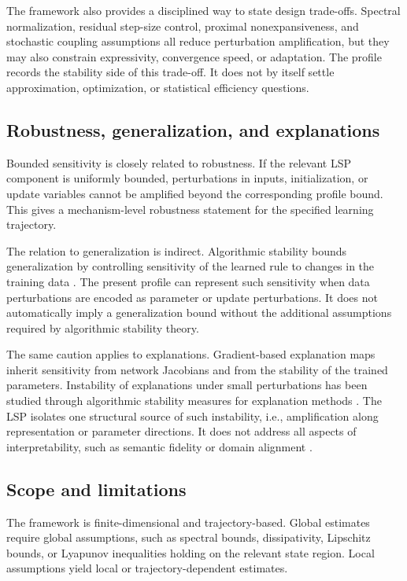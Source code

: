 \documentclass{article}
\numberwithin{equation}{section}
\begin{document}
The framework also provides a disciplined way to state design trade-offs. Spectral normalization, residual step-size control, proximal nonexpansiveness, and stochastic coupling assumptions all reduce perturbation amplification, but they may also constrain expressivity, convergence speed, or adaptation. The profile records the stability side of this trade-off. It does not by itself settle approximation, optimization, or statistical efficiency questions.

\subsection{Robustness, generalization, and explanations}
\label{subsec:robustness-generalization-explanations}

Bounded sensitivity is closely related to robustness. If the relevant LSP component is uniformly bounded, perturbations in inputs, initialization, or update variables cannot be amplified beyond the corresponding profile bound. This gives a mechanism-level robustness statement for the specified learning trajectory.

The relation to generalization is indirect. Algorithmic stability bounds generalization by controlling sensitivity of the learned rule to changes in the training data \cite{Bousquet2002,Hardt2016Train}. The present profile can represent such sensitivity when data perturbations are encoded as parameter or update perturbations. It does not automatically imply a generalization bound without the additional assumptions required by algorithmic stability theory.

The same caution applies to explanations. Gradient-based explanation maps inherit sensitivity from network Jacobians and from the stability of the trained parameters. Instability of explanations under small perturbations has been studied through algorithmic stability measures for explanation methods \cite{Fel2022}. The LSP isolates one structural source of such instability, i.e., amplification along representation or parameter directions. It does not address all aspects of interpretability, such as semantic fidelity or domain alignment
\cite{Abusitta2024}.

\subsection{Scope and limitations}
\label{subsec:scope-limitations}

The framework is finite-dimensional and trajectory-based. Global estimates require global assumptions, such as spectral bounds, dissipativity, Lipschitz bounds, or Lyapunov inequalities holding on the relevant state region. Local assumptions yield local or trajectory-dependent estimates.
\end{document}
